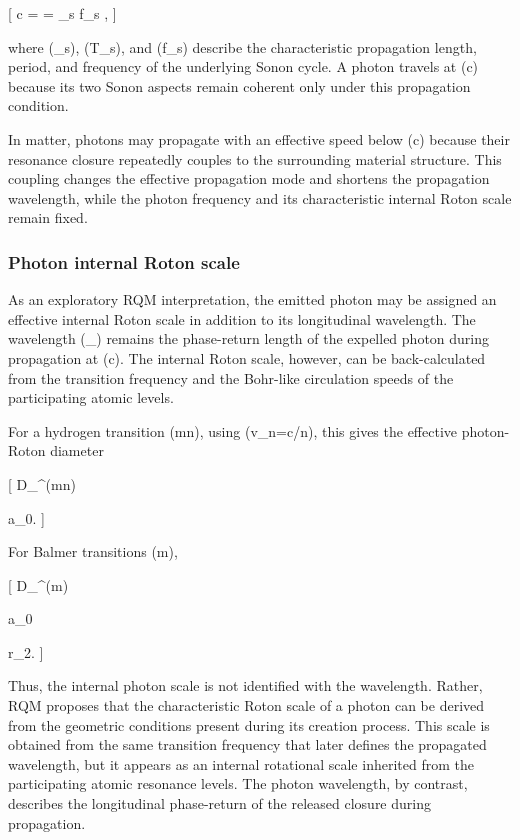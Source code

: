 \documentclass[11pt,a4paper]{article}
\begin{document}
[
c =  = \lambda_s f_s ,
]

where (\lambda_s), (T_s), and (f_s) describe the characteristic propagation length, period, and frequency of the underlying Sonon cycle. A photon travels at (c) because its two Sonon aspects remain coherent only under this propagation condition.

In matter, photons may propagate with an effective speed below (c) because their resonance closure repeatedly couples to the surrounding material structure. This coupling changes the effective propagation mode and shortens the propagation wavelength, while the photon frequency and its characteristic internal Roton scale remain fixed.


\subsubsection{Photon internal Roton scale}

As an exploratory RQM interpretation, the emitted photon may be assigned an effective internal Roton scale in addition to its longitudinal wavelength. The wavelength (\lambda_\gamma) remains the phase-return length of the expelled photon during propagation at (c). The internal Roton scale, however, can be back-calculated from the transition frequency and the Bohr-like circulation speeds of the participating atomic levels.

For a hydrogen transition (m\rightarrow n), using (v_n=\alpha c/n), this gives the effective photon-Roton diameter

[
D_\gamma^{(m\rightarrow n)}

a_0.
]

For Balmer transitions (m),

[
D_\gamma^{(m)}

a_0

r_2.
]

Thus, the internal photon scale is not identified with the wavelength. Rather, RQM proposes that the characteristic Roton scale of a photon can be derived from the geometric conditions present during its creation process. This scale is obtained from the same transition frequency that later defines the propagated wavelength, but it appears as an internal rotational scale inherited from the participating atomic resonance levels. The photon wavelength, by contrast, describes the longitudinal phase-return of the released closure during propagation.
\end{document}
